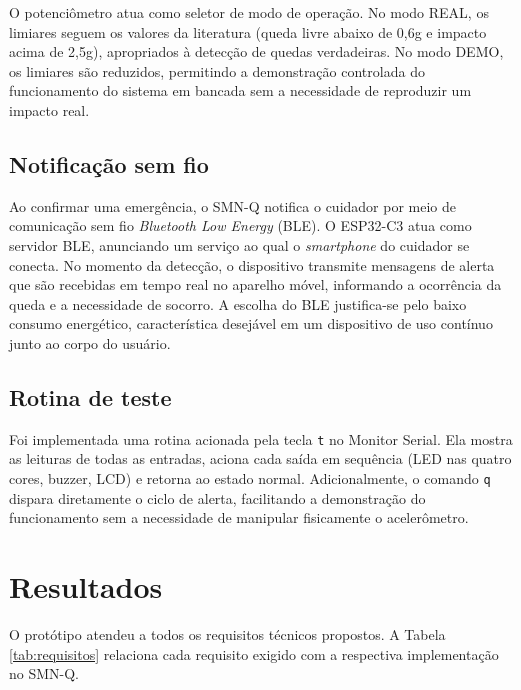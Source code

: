 O potenciômetro atua como seletor de modo de operação. No modo REAL, os limiares seguem os valores da literatura (queda livre abaixo de 0,6g e impacto acima de 2,5g), apropriados à detecção de quedas verdadeiras. No modo DEMO, os limiares são reduzidos, permitindo a demonstração controlada do funcionamento do sistema em bancada sem a necessidade de reproduzir um impacto real.

\subsection{\esp Notificação sem fio}

Ao confirmar uma emergência, o SMN-Q notifica o cuidador por meio de comunicação sem fio \textit{Bluetooth Low Energy} (BLE). O ESP32-C3 atua como servidor BLE, anunciando um serviço ao qual o \textit{smartphone} do cuidador se conecta. No momento da detecção, o dispositivo transmite mensagens de alerta que são recebidas em tempo real no aparelho móvel, informando a ocorrência da queda e a necessidade de socorro. A escolha do BLE justifica-se pelo baixo consumo energético, característica desejável em um dispositivo de uso contínuo junto ao corpo do usuário.

\subsection{\esp Rotina de teste}

Foi implementada uma rotina acionada pela tecla \verb|t| no Monitor Serial. Ela mostra as leituras de todas as entradas, aciona cada saída em sequência (LED nas quatro cores, buzzer, LCD) e retorna ao estado normal. Adicionalmente, o comando \verb|q| dispara diretamente o ciclo de alerta, facilitando a demonstração do funcionamento sem a necessidade de manipular fisicamente o acelerômetro.

\section{\esp Resultados}

O protótipo atendeu a todos os requisitos técnicos propostos. A Tabela \ref{tab:requisitos} relaciona cada requisito exigido com a respectiva implementação no SMN-Q.

